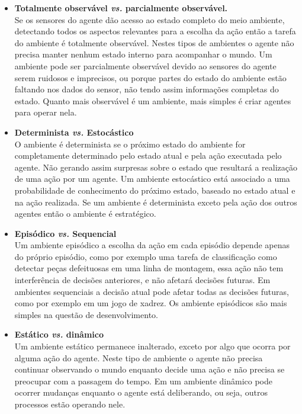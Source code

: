 \begin{itemize}
\item \textbf{Totalmente observável \textit{vs.} parcialmente observável.} \\
Se os sensores do agente dão acesso ao estado completo do meio ambiente, detectando todos os aspectos relevantes para a escolha da ação então a tarefa do ambiente é totalmente observável. Nestes tipos de ambientes o agente não precisa manter nenhum estado interno para acompanhar o mundo. Um ambiente pode ser parcialmente observável devido ao sensores do agente serem ruidosos e imprecisos, ou porque partes do estado do ambiente estão faltando nos dados do sensor, não tendo assim informações completas do estado. Quanto mais observável é um ambiente, mais simples é criar agentes para operar nela.

\item \textbf{Determinista \textit{vs.} Estocástico}\\
O ambiente é determinista se o próximo estado do ambiente for completamente determinado pelo estado atual e pela ação executada pelo agente. Não gerando assim surpresas sobre o estado que resultará a realização de uma ação por um agente. Um ambiente estocástico está associado a uma probabilidade de conhecimento do próximo estado, baseado no estado atual e na ação realizada. Se um ambiente é determinista exceto pela ação dos outros agentes então o ambiente é estratégico.

\item \textbf{Episódico \textit{vs.} Sequencial} \\
Um ambiente episódico a escolha da ação em cada episódio depende apenas do próprio episódio, como por exemplo uma tarefa de classificação como detectar peças defeituosas em uma linha de montagem, essa ação não tem interferência de decisões anteriores, e não afetará decisões futuras. Em ambientes sequenciais a decisão atual pode afetar todas as decisões futuras, como por exemplo em um jogo de xadrez. Os ambiente episódicos são mais simples na questão de desenvolvimento.

\item \textbf{Estático \textit{vs.} dinâmico} \\
Um ambiente estático permanece inalterado, exceto por algo que ocorra por alguma ação do agente. Neste tipo de ambiente o agente não precisa continuar observando o mundo enquanto decide uma ação e não precisa se preocupar com a passagem do tempo. Em um ambiente dinâmico pode ocorrer mudanças enquanto o agente está deliberando, ou seja, outros processos estão operando nele.


\end{itemize}
